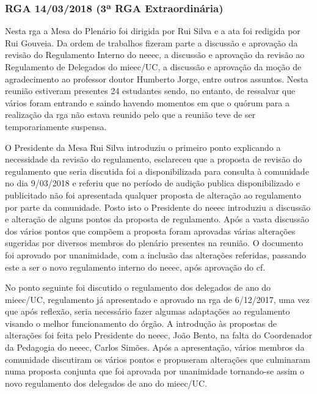 
\subsubsection{RGA 14/03/2018 (3ª RGA Extraordinária)}

Nesta \acrshort{rga} a Mesa do Plenário foi dirigida por Rui Silva e a ata foi redigida por Rui Gouveia. Da ordem de trabalhos fizeram parte a discussão e aprovação da revisão do Regulamento Interno do \acrshort{neeec}, a discussão e aprovação da revisão ao Regulamento de Delegados do \acrshort{mieec}/UC, a discussão e aprovação da moção de agradecimento ao professor doutor Humberto Jorge, entre outros assuntos. Nesta reunião estiveram presentes 24 estudantes sendo, no entanto, de ressalvar que vários foram entrando e saindo havendo momentos em que o quórum para a realização da \acrshort{rga} não estava reunido pelo que a reunião teve de ser temporariamente suspensa.

O Presidente da Mesa Rui Silva introduziu o primeiro ponto explicando a necessidade da revisão do regulamento, esclareceu que a proposta de revisão do regulamento que seria discutida foi a disponibilizada para consulta à comunidade no dia 9/03/2018 e referiu que no período de audição publica disponibilizado e publicitado não foi apresentada qualquer proposta de alteração ao regulamento por parte da comunidade. Posto isto o Presidente do \acrshort{neeec} introduziu a discussão e alteração de alguns pontos da proposta de regulamento. Após a vasta discussão dos vários pontos que compõem a proposta foram aprovadas várias alterações sugeridas por diversos membros do plenário presentes na reunião. O documento foi aprovado por unanimidade, com a inclusão das alterações referidas, passando este a ser o novo regulamento interno do \acrshort{neeec}, após aprovação do \acrlong{cf}.

No ponto seguinte foi discutido o regulamento dos delegados de ano do \acrshort{mieec}/UC, regulamento já apresentado e aprovado na \acrshort{rga} de 6/12/2017, uma vez que após reflexão, seria necessário fazer algumas adaptações ao regulamento visando o melhor funcionamento do órgão. A introdução às propostas de alterações foi feita pelo Presidente do \acrshort{neeec}, João Bento, na falta do Coordenador da Pedagogia do \acrshort{neeec}, Carlos Simões. Após a apresentação, vários membros da comunidade discutiram os vários pontos e propuseram alterações que culminaram numa proposta conjunta que foi aprovada por unanimidade tornando-se assim o novo regulamento dos delegados de ano do \acrshort{mieec}/UC.

